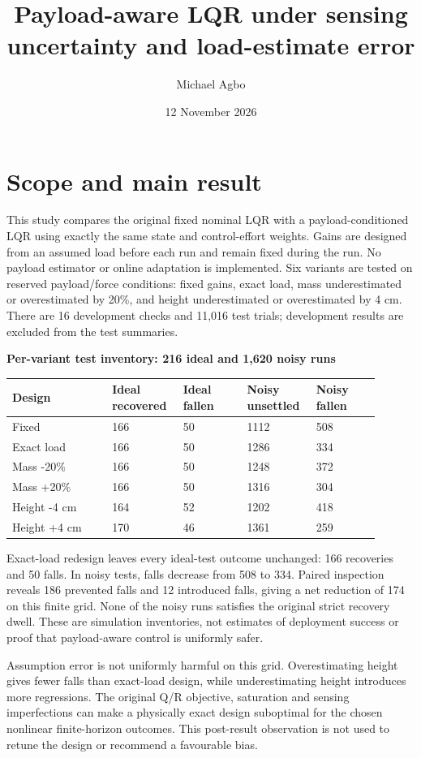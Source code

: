 \documentclass[11pt,a4paper]{article}
\title{Payload-aware LQR under sensing uncertainty and load-estimate error}
\author{Michael Agbo}
\date{12 November 2026}
\begin{document}
\maketitle
\section*{Scope and main result}
This study compares the original fixed nominal LQR with a payload-conditioned LQR using exactly the same state and control-effort weights. Gains are designed from an assumed load before each run and remain fixed during the run. No payload estimator or online adaptation is implemented. Six variants are tested on reserved payload/force conditions: fixed gains, exact load, mass underestimated or overestimated by 20\%, and height underestimated or overestimated by 4 cm. There are 16 development checks and 11,016 test trials; development results are excluded from the test summaries.

\textbf{Per-variant test inventory: 216 ideal and 1,620 noisy runs}
\begin{longtable}{p{0.252\linewidth}p{0.162\linewidth}p{0.162\linewidth}p{0.162\linewidth}p{0.162\linewidth}}
\toprule
Design & Ideal recovered & Ideal fallen & Noisy unsettled & Noisy fallen \\ \midrule \endhead
Fixed & 166 & 50 & 1112 & 508 \\
Exact load & 166 & 50 & 1286 & 334 \\
Mass -20\% & 166 & 50 & 1248 & 372 \\
Mass +20\% & 166 & 50 & 1316 & 304 \\
Height -4 cm & 164 & 52 & 1202 & 418 \\
Height +4 cm & 170 & 46 & 1361 & 259 \\
\bottomrule
\end{longtable}
Exact-load redesign leaves every ideal-test outcome unchanged: 166 recoveries and 50 falls. In noisy tests, falls decrease from 508 to 334. Paired inspection reveals 186 prevented falls and 12 introduced falls, giving a net reduction of 174 on this finite grid. None of the noisy runs satisfies the original strict recovery dwell. These are simulation inventories, not estimates of deployment success or proof that payload-aware control is uniformly safer.

Assumption error is not uniformly harmful on this grid. Overestimating height gives fewer falls than exact-load design, while underestimating height introduces more regressions. The original Q/R objective, saturation and sensing imperfections can make a physically exact design suboptimal for the chosen nonlinear finite-horizon outcomes. This post-result observation is not used to retune the design or recommend a favourable bias.
\end{document}
